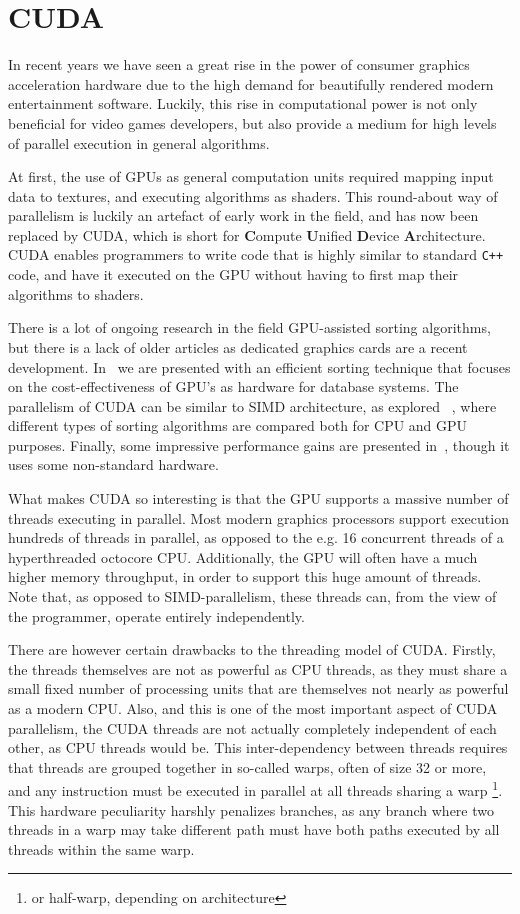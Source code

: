\FloatBarrier
\section{CUDA} 
\label{sec:CUDAImpl}

In recent years we have seen a great rise in the power of consumer graphics acceleration hardware due to the high demand for beautifully rendered modern entertainment software. Luckily, this rise in computational power is not only beneficial for video games developers, but also provide a medium for high levels of parallel execution in general algorithms.

At first, the use of GPUs as general computation units required mapping input data to textures, and executing algorithms as shaders.
This round-about way of parallelism is luckily an artefact of early work in the field, and has now been replaced by CUDA, which is short for \textbf{C}ompute \textbf{U}nified \textbf{D}evice \textbf{A}rchitecture. 
CUDA enables programmers to write code that is highly similar to standard \texttt{C++} code, and have it executed on the GPU without having to first map their algorithms to shaders.

There is a lot of ongoing research in the field GPU-assisted sorting algorithms, but there is a lack of older articles as dedicated graphics cards are a recent development. In~ we are presented with an efficient sorting technique that focuses on the cost-effectiveness of GPU's as hardware for database systems. The parallelism of CUDA can be similar to SIMD architecture, as explored ~, where different types of sorting algorithms are compared both for CPU and GPU purposes. Finally, some impressive performance gains are presented in~, though it uses some non-standard hardware.

What makes CUDA so interesting is that the GPU supports a massive number of threads executing in parallel.
Most modern graphics processors support execution hundreds of threads in parallel, as opposed to the e.g. 16 concurrent threads of a hyperthreaded octocore CPU. Additionally, the GPU will often have a much higher memory throughput, in order to support this huge amount of threads. Note that, as opposed to SIMD-parallelism, these threads can, from the view of the programmer, operate entirely independently.

There are however certain drawbacks to the threading model of CUDA. Firstly, the threads themselves are not as powerful as CPU threads, as they must share a small fixed number of processing units that are themselves not nearly as powerful as a modern CPU. Also, and this is one of the most important aspect of CUDA parallelism, the CUDA threads are not actually completely independent of each other, as CPU threads would be. This inter-dependency between threads requires that threads are grouped together in so-called warps, often of size 32 or more, and any instruction must be executed in parallel at all threads sharing a warp \footnote{or half-warp, depending on architecture}. This hardware peculiarity harshly penalizes branches, as any branch where two threads in a warp may take different path must have both paths executed by all threads within the same warp.

